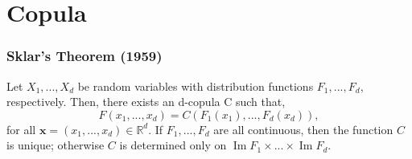\documentclass[pdf,9pt,xcolor=dvipsnames,hide notes]{beamer}
\DeclareMathOperator{\Ima}{Im}
\begin{document}
\section{Copula}
	
		\begin{frame}[label=frame1c2]
	\frametitle{Sklar's Theorem (1959)}
	
	
\begin{theorem}
	Let $X_{1},...,X_{d}$ be random variables with distribution functions $F_{1},...,F_{d}$, respectively. Then, there exists an d-copula C such that,
	\begin{equation}
	F\left( x_{1},...,x_{d}\right) =C\left( F_{1}\left( x_{1}\right)
	,...,F_{d}\left( x_{d}\right) \right) ,  \label{1} 
	\end{equation}
\noindent for all $\mathbf{x}=\left( x_{1},...,x_{d}\right) \in
\mathbb{R}^{d}$. If $F_{1},...,F_{d}$ are all continuous, then the function $C$ is unique; otherwise $C$ is determined only on $\Ima F_{1}\times ...\times \Ima F_{d}$. 
\end{theorem}


\end{frame}
\end{document}
